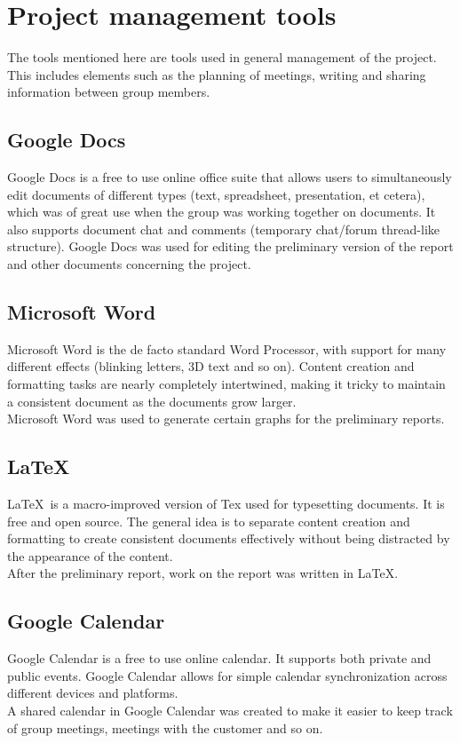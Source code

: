 \section{Project management tools}
The tools mentioned here are tools used in general management of the project. This includes elements such as the planning of meetings, writing and sharing information between group members.

\subsection{Google Docs}
Google Docs is a free to use online office suite that allows users to simultaneously edit documents of different types (text, spreadsheet, presentation, et cetera), which was of great use when the group was working together on documents. It also supports document chat and comments (temporary chat/forum thread-like structure). Google Docs was used for editing the preliminary version of the report and other documents concerning the project.

\subsection{Microsoft Word}
Microsoft Word is the de facto standard Word Processor, with support for many different effects (blinking letters, 3D text and so on). Content creation and formatting tasks are nearly completely intertwined, making it tricky to maintain a consistent document as the documents grow larger.\\
Microsoft Word was used to generate certain graphs for the preliminary reports.

\subsection{\LaTeX}
\LaTeX ~is a macro-improved version of Tex used for typesetting documents. It is free and open source. The general idea is to separate content creation and formatting to create consistent documents effectively without being distracted by the appearance of the content.\\
After the preliminary report, work on the report was written in \LaTeX.

\subsection{Google Calendar}
Google Calendar is a free to use online calendar. It supports both private and public events. Google Calendar allows for simple calendar synchronization across different devices and platforms.\\
A shared calendar in Google Calendar was created to make it easier to keep track of group meetings, meetings with the customer and so on.

